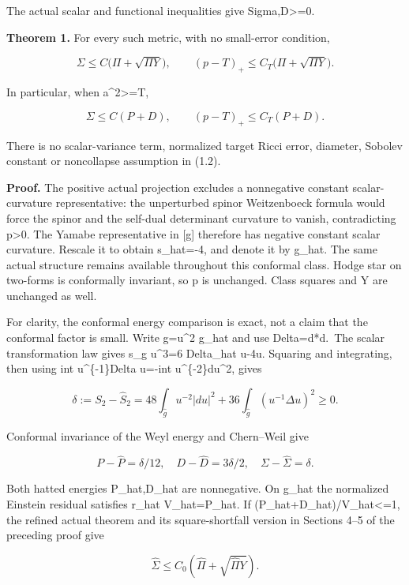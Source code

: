 \documentclass[
  10pt,
]{article}
\begin{document}
The actual scalar and functional inequalities give
Sigma,D\textgreater=0.

\textbf{Theorem 1.} For every such metric, with no small-error
condition,

\[
 \boxed{\Sigma\le C\bigl(\Pi+\sqrt{\Pi Y}\bigr),\qquad
 (p-T)_+\le C_T\bigl(\Pi+\sqrt{\Pi Y}\bigr).}             \tag{1.2}
\]

In particular, when a\^{}2\textgreater=T,

\[
 \boxed{\Sigma\le C(P+D),\qquad (p-T)_+\le C_T(P+D).}     \tag{1.3}
\]

There is no scalar-variance term, normalized target Ricci error,
diameter, Sobolev constant or noncollapse assumption in (1.2).

\textbf{Proof.} The positive actual projection excludes a nonnegative
constant scalar-curvature representative: the unperturbed spinor
Weitzenboeck formula would force the spinor and the self-dual
determinant curvature to vanish, contradicting p\textgreater0. The
Yamabe representative in {[}g{]} therefore has negative constant scalar
curvature. Rescale it to obtain s\_hat=-4, and denote it by g\_hat. The
same actual structure remains available throughout this conformal class.
Hodge star on two-forms is conformally invariant, so p is unchanged.
Class squares and Y are unchanged as well.

For clarity, the conformal energy comparison is exact, not a claim that
the conformal factor is small. Write g=u\^{}2 g\_hat and use
Delta=d*d.~The scalar transformation law gives s\_g u\^{}3=6 Delta\_hat
u-4u. Squaring and integrating, then using int u\^{}\{-1\}Delta u=-int
u\^{}\{-2\}\textbar du\textbar\^{}2, gives

\[
 \delta:=S_2-\widehat S_2
 =48\int_{\widehat g}u^{-2}|du|^2
       +36\int_{\widehat g}(u^{-1}\Delta u)^2\ge0.        \tag{1.4}
\]

Conformal invariance of the Weyl energy and Chern--Weil give

\[
 P-\widehat P=\delta/12,\quad
 D-\widehat D=3\delta/2,\quad
 \Sigma-\widehat\Sigma=\delta.                          \tag{1.5}
\]

Both hatted energies P\_hat,D\_hat are nonnegative. On g\_hat the
normalized Einstein residual satisfies r\_hat V\_hat=P\_hat. If
(P\_hat+D\_hat)/V\_hat\textless=1, the refined actual theorem and its
square-shortfall version in Sections 4--5 of the preceding proof give

\[
 \widehat\Sigma\le C_0\left(\widehat\Pi+
                             \sqrt{\widehat\Pi Y}\right).
\]
\end{document}
